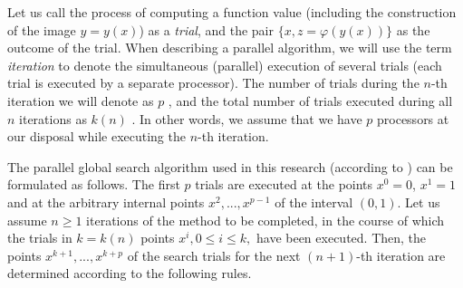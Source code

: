 \documentclass{svproc}
\begin{document}
Let us call the process of computing a function value (including the construction of the image $y=y(x)$) as a \textit{trial}, and the pair $\{x, z = \varphi(y(x))\}$ as the outcome of the trial.
When describing a parallel algorithm, we will use the term \textit {iteration} to denote the simultaneous (parallel) execution of several trials (each trial is executed by a separate processor). The number of trials during the $n$-th iteration we will denote as $p$ , and the total number of trials executed during all $n$ iterations as $k(n)$ . In other words, we assume that we have  $p$  processors at our disposal while executing the $n$-th iteration. 

The parallel global search algorithm used in this research (according to \cite{Strongin2000}) can be formulated as follows.
The first $p$ trials are executed at the points $x^0 = 0$, $x^1 = 1$ and at the arbitrary internal points $x^2, ..., x^{p-1}$ of the interval $(0,1)$. Let us assume $n \geq 1$  iterations of the method to be completed, in the course of which the trials in $k=k(n)$ points $x^i, 0 \leq i \leq k,$ have been executed. Then, the points $x^{k+1},...,x^{k+p}$  of the search trials for the next $(n+1)$-th iteration are determined according to the following rules. 
\end{document}
